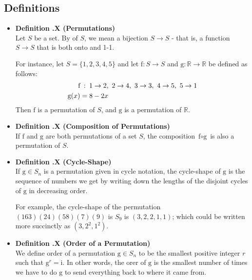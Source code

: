\documentclass[a4paper,12pt]{article}
\newcommand{\defi}[1]{
    \item \textbf{Definition \thesection.#1}\\
}
\let\emph\relax %
\begin{document}
\subsection{Definitions}
\begin{itemize}
    \defi {X (Permutations)}
    Let $S$ be a set. By \emph{permutation} of $S$, we mean a bijection $S \to S$ - that is, a function $S \to S$ that is both onto and 1-1.

    For instance, let $S = \{1, 2, 3, 4, 5\}$ and let $\text{f}: S \to S$ and $\text{g}: \mathbb{R} \to \mathbb{R}$ be defined as
    follows:
    \begin{align*}
       \text{f}&\mathrel{\makebox[\widthof{=}]{:}} 1 \to 2,\ 2 \to 4,\ 3 \to 3,\ 4 \to 5,\ 5 \to 1\\
       \text{g}(x) &= 8 - 2x
    \end{align*}
    Then $\text{f}$ is a permutation of $S$, and $\text{g}$ is a permutation of
    $\mathbb{R}$.
    
    \defi {X (Composition of Permutations)}
    If $\text{f}$ and $\text{g}$ are both permutations of a set $S$, the composition $\text{f} \circ \text{g}$ is also a permutation of $S$.
    
    \defi {X (Cycle-Shape)}
    If $\text{g} \in S_n$ is a permutation given in cycle notation, the cycle-shape of
    $\text{g}$ is the sequence of numbers we get by writing down the lengths of the
    disjoint cycles of $\text{g}$ in decreasing order.
    
    For example, the cycle-shape of the permutation $(163)(24)(58)(7)(9)$ is $S_9$ is
    $(3, 2, 2, 1, 1)$; which could be written more succinctly as $(3, 2^2, 1^2)$.
    
    \defi {X (Order of a Permutation)}
    We define order of a permutation $\text{g} \in S_n$ to be the smallest positive integer
    $r$ such that $\text{g}^r = \text{i}$. In other words, the orer of $\text{g}$ is the
    smallest number of times we have to do $\text{g}$ to send everything back to where it
    came from.
\end{itemize}
\end{document}
